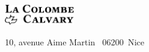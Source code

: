 \begin{titlepage}
\begin{center}
\mbox{}
\vfill
{}
\vfill
\enlargethispage{\footskip}
\includegraphics[width=3cm]{colombecalvary.pdf}

10, avenue Aime Martin \mybullet~06200~Nice
\end{center}
\end{titlepage}
\pagebreak

